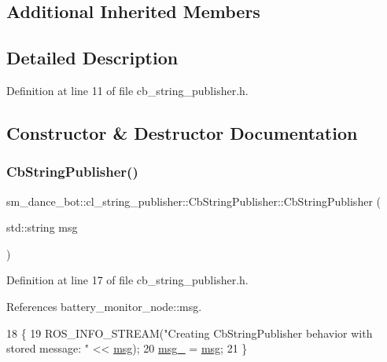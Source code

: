 \subsection*{Additional Inherited Members}


\subsection{Detailed Description}


Definition at line 11 of file cb\+\_\+string\+\_\+publisher.\+h.



\subsection{Constructor \& Destructor Documentation}
\mbox{\label{classsm__dance__bot_1_1cl__string__publisher_1_1CbStringPublisher_abe08b99960be5c26acce0cb062ceea5f}} 
\subsubsection{\texorpdfstring{Cb\+String\+Publisher()}{CbStringPublisher()}}
{\footnotesize\ttfamily sm\+\_\+dance\+\_\+bot\+::cl\+\_\+string\+\_\+publisher\+::\+Cb\+String\+Publisher\+::\+Cb\+String\+Publisher (\begin{DoxyParamCaption}\item[{std\+::string}]{msg }\end{DoxyParamCaption})\hspace{0.3cm}{\ttfamily [inline]}}



Definition at line 17 of file cb\+\_\+string\+\_\+publisher.\+h.



References battery\+\_\+monitor\+\_\+node\+::msg.


\begin{DoxyCode}
18     \{
19         ROS\_INFO\_STREAM(\textcolor{stringliteral}{"Creating CbStringPublisher behavior with stored message: "} << 
      \hyperlink{namespacebattery__monitor__node_ab1920c64448816edd4064e494275fdff}{msg});
20         \hyperlink{classsm__dance__bot_1_1cl__string__publisher_1_1CbStringPublisher_a320ff6940dc15b469af3679d2d2eb655}{msg\_} = \hyperlink{namespacebattery__monitor__node_ab1920c64448816edd4064e494275fdff}{msg};
21     \}
\end{DoxyCode}


